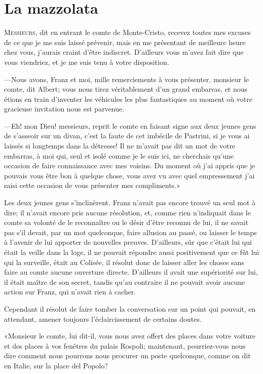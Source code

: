 \chapter{La mazzolata} 

\lettrine[ante=«]{M}{essieurs,} dit en entrant le comte de Monte-Cristo, recevez toutes mes excuses de ce que je me suis laissé prévenir, mais en me présentant de meilleure heure chez vous, j'aurais craint d'être indiscret. D'ailleurs vous m'avez fait dire que vous viendriez, et je me suis tenu à votre disposition. 

—Nous avons, Franz et moi, mille remerciements à vous présenter, monsieur le comte, dit Albert; vous nous tirez véritablement d'un grand embarras, et nous étions en train d'inventer les véhicules les plus fantastiques au moment où votre gracieuse invitation nous est parvenue. 

—Eh! mon Dieu! messieurs, reprit le comte en faisant signe aux deux jeunes gens de s'asseoir sur un divan, c'est la faute de cet imbécile de Pastrini, si je vous ai laissés si longtemps dans la détresse! Il ne m'avait pas dit un mot de votre embarras, à moi qui, seul et isolé comme je le suis ici, ne cherchais qu'une occasion de faire connaissance avec mes voisins. Du moment où j'ai appris que je pouvais vous être bon à quelque chose, vous avez vu avec quel empressement j'ai saisi cette occasion de vous présenter mes compliments.»  

Les deux jeunes gens s'inclinèrent. Franz n'avait pas encore trouvé un seul mot à dire; il n'avait encore pris aucune résolution, et, comme rien n'indiquait dans le comte sa volonté de le reconnaître ou le désir d'être reconnu de lui, il ne savait pas s'il devait, par un mot quelconque, faire allusion au passé, ou laisser le temps à l'avenir de lui apporter de nouvelles preuves. D'ailleurs, sûr que c'était lui qui était la veille dans la loge, il ne pouvait répondre aussi positivement que ce fût lui qui la surveille, était au Colisée, il résolut donc de laisser aller les choses sans faire au comte aucune ouverture directe. D'ailleurs il avait une supériorité sur lui, il était maître de son secret, tandis qu'au contraire il ne pouvait avoir aucune action sur Franz, qui n'avait rien à cacher.  

Cependant il résolut de faire tomber la conversation sur un point qui pouvait, en attendant, amener toujours l'éclaircissement de certains doutes. 

«Monsieur le comte, lui dit-il, vous nous avez offert des places dans votre voiture et des places à vos fenêtres du palais Rospoli; maintenant, pourriez-vous nous dire comment nous pourrons nous procurer un poste quelconque, comme on dit en Italie, sur la place del Popolo? 

